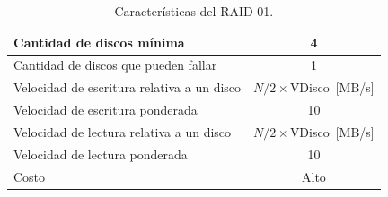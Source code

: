 \begin{table}[!ht]
  \centering
  \begin{tabular}{l|c}
    Cantidad de discos mínima & 4 \\\hline
    Cantidad de discos que pueden fallar & 1 \\ \hline
    Velocidad de escritura relativa a un disco & \(N/2\times\)VDisco~[MB/s] \\\hline
    Velocidad de escritura ponderada & 10 \\ \hline
    Velocidad de lectura relativa a un disco & \(N/2\times\)VDisco~[MB/s] \\ \hline
    Velocidad de lectura ponderada & 10 \\ \hline
    Costo & Alto
  \end{tabular}
  \caption{Características del RAID 01.}
\end{table}
